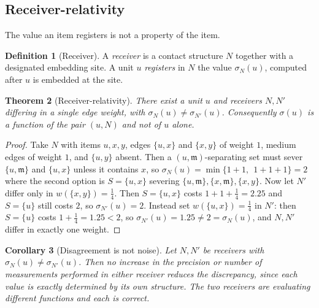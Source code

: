 \documentclass[11pt,twocolumn,a4paper]{article}
\theoremstyle{plain}
\newtheorem{theorem}{Theorem}[section]
\newtheorem{corollary}[theorem]{Corollary}
\theoremstyle{definition}
\newtheorem{definition}[theorem]{Definition}
\theoremstyle{remark}
\newcommand{\sep}{\sigma}                      %
\newcommand{\med}{\mathfrak{m}}                %
\newcommand{\weight}{w}
\begin{document}
\subsection{Receiver-relativity}

The value an item registers is not a property of the item.

\begin{definition}[Receiver]
\label{def:receiver}
A \emph{receiver} is a contact structure $N$ together with a designated
embedding site. A unit $u$ \emph{registers} in $N$ the value
$\sep_N(u)$, computed after $u$ is embedded at the site.
\end{definition}

\begin{theorem}[Receiver-relativity]
\label{thm:receiver}
There exist a unit $u$ and receivers $N,N'$ differing in a single edge
weight, with $\sep_N(u)\ne\sep_{N'}(u)$. Consequently $\sep(u)$ is a
function of the pair $(u,N)$ and not of $u$ alone.
\end{theorem}

\begin{proof}
Take $N$ with items $u,x,y$, edges $\{u,x\}$ and $\{x,y\}$ of weight $1$,
medium edges of weight $1$, and $\{u,y\}$ absent. Then a
$(u,\med)$-separating set must sever $\{u,\med\}$ and $\{u,x\}$ unless it
contains $x$, so $\sep_N(u)=\min\{1+1,\;\,1+1+1\}=2$ where the second
option is $S=\{u,x\}$ severing $\{u,\med\},\{x,\med\},\{x,y\}$. Now let
$N'$ differ only in $\weight(\{x,y\})=\tfrac14$. Then $S=\{u,x\}$ costs
$1+1+\tfrac14=2.25$ and $S=\{u\}$ still costs $2$, so $\sep_{N'}(u)=2$.
Instead set $\weight(\{u,x\})=\tfrac14$ in $N'$: then $S=\{u\}$ costs
$1+\tfrac14=1.25<2$, so $\sep_{N'}(u)=1.25\neq 2=\sep_N(u)$, and $N,N'$
differ in exactly one weight.
\end{proof}

\begin{corollary}[Disagreement is not noise]
\label{cor:notnoise}
Let $N,N'$ be receivers with $\sep_N(u)\ne\sep_{N'}(u)$. Then no
increase in the precision or number of measurements performed in either
receiver reduces the discrepancy, since each value is exactly determined
by its own structure. The two receivers are evaluating different
functions and each is correct.
\end{corollary}
\end{document}

